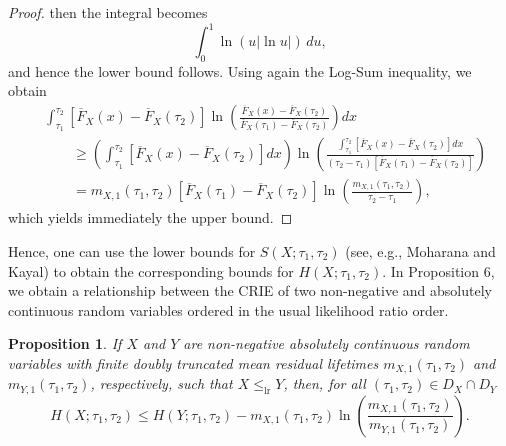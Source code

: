 \documentclass[11pt]{article}
\newtheorem{proposition}{Proposition}
\begin{document}
\begin{proof}
	then the integral becomes
	$$ \textstyle \int_0^1 \ln(u|\ln u|)\,du, $$
	and hence the lower bound follows. Using again the Log-Sum inequality, we obtain
	\begin{align*}
		& \textstyle \int_{\tau_1}^{\tau_2} [\overline{F}_X(x)-\overline{F}_X(\tau_2)] \ln\left( \frac{\overline{F}_X(x)-\overline{F}_X(\tau_2)}{\overline{F}_X(\tau_1)-\overline{F}_X(\tau_2)} \right)dx \\
		& \textstyle \qquad \geq \left(\int_{\tau_1}^{\tau_2} [\overline{F}_X(x)-\overline{F}_X(\tau_2)]dx\right) \ln\left( \frac{\int_{\tau_1}^{\tau_2} [\overline{F}_X(x)-\overline{F}_X(\tau_2)]dx}{(\tau_2-\tau_1)[\overline{F}_X(\tau_1)-\overline{F}_X(\tau_2)]} \right) \\
		& \textstyle \qquad = m_{X,1}(\tau_1,\tau_2)[\overline{F}_X(\tau_1)-\overline{F}_X(\tau_2)] \ln\left( \frac{m_{X,1}(\tau_1,\tau_2)}{\tau_2 - \tau_1} \right),
	\end{align*}
	which yields immediately the upper bound.
\end{proof}

Hence, one can use the lower bounds for $S(X;\tau_1,\tau_2)$ (see, e.g., Moharana and Kayal\cite{Moharana2020}) to obtain the corresponding bounds for $H(X;\tau_1,\tau_2)$.
In Proposition 6, we obtain a relationship between the CRIE of two non-negative and absolutely continuous random variables ordered in the usual likelihood ratio order.
 
\begin{proposition}
	If $X$ and $Y$ are non-negative absolutely continuous random variables with finite doubly truncated mean residual lifetimes $m_{X,1}(\tau_1,\tau_2) $ and $ m_{Y,1}(\tau_1,\tau_2)$, respectively, such that $X \leq_{\text{lr}} Y$, then, for all $(\tau_1,\tau_2) \in D_X \cap D_Y$
	$$ H(X;\tau_1,\tau_2 ) \leq H(Y;\tau_1,\tau_2 ) - m_{X,1}(\tau_1,\tau_2 ) \ln\left( \frac{m_{X,1}(\tau_1,\tau_2 )}{m_{Y,1}(\tau_1,\tau_2 )} \right). $$
\end{proposition}
\end{document}
